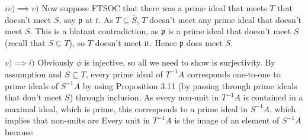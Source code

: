 \documentclass[a4paper]{exam}
\begin{document}
\begin{questions}
\begin{solution}
	$iv) \implies v) $
	Now suppose FTSOC that there was a prime ideal that meets $T $ that doesn't meet $S $, say $\mathfrak{p} $ at $t $.
	As $T \subseteq \overline{S}  $, $T $ doesn't meet any prime ideal that doesn't meet $S $.
	This is a blatant contradiction, as $\mathfrak{p} $ is a prime ideal that doesn't meet $S $ (recall that $S \subseteq T $), so $T $ doesn't meet it.
	Hence $\mathfrak{p} $ does meet $S $.

	$v) \implies i) $ Obviously $\phi  $ is injective, so all we need to show is surjectivity.
	By assumption and $S\subseteq T $, every prime ideal of $T^{-1}A $ corresponds one-to-one to prime ideals of $S^{-1}A $ by using Proposition 3.11 (by passing through prime ideals that don't meet $S $) through inclusion.
	As every non-unit in $T^{-1}A $ is contained in a maximal ideal, which is prime, this corresponds to a prime ideal in $S^{-1}A $, which implies that non-units are 
	Every unit in $T^{-1}A $ is the image of an element of $S^{-1}A $ because 
\end{solution}


\end{questions}
\end{document}
